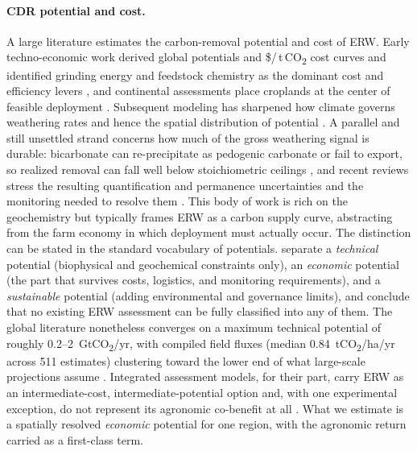 \documentclass[12pt]{article}
\newcommand{\tco}{\,t\,CO\textsubscript{2}}
\newcommand{\co}{CO\textsubscript{2}}
\begin{document}
\paragraph{CDR potential and cost.}
A large literature estimates the carbon-removal potential and cost of ERW. Early
techno-economic work derived global potentials and \$/\tco{} cost curves and
identified grinding energy and feedstock chemistry as the dominant cost and
efficiency levers \citep{strefler2018}, and continental assessments place
croplands at the center of feasible deployment \citep{beerling2020,beerling2025}.
Subsequent modeling has sharpened how climate governs weathering rates and hence
the spatial distribution of potential \citep{baek2023,deng2023}. A parallel and
still unsettled strand concerns how much of the gross weathering signal is
durable: bicarbonate can re-precipitate as pedogenic carbonate or fail to export,
so realized removal can fall well below stoichiometric ceilings
\citep{renforth2019,kanzaki2023}, and recent reviews stress the resulting
quantification and permanence uncertainties and the monitoring needed to resolve
them \citep{schiedung2026,levy2024,beerling2025nree,suhrhoff2026esroc}. This body of work is rich on
the geochemistry but typically frames ERW as a carbon supply curve, abstracting
from the farm economy in which deployment must actually occur.
The distinction can be stated in the standard vocabulary of potentials.
\citet[\S5.2.1]{suhrhoff2026esroc} separate a \emph{technical} potential
(biophysical and geochemical constraints only), an \emph{economic} potential (the
part that survives costs, logistics, and monitoring requirements), and a
\emph{sustainable} potential (adding environmental and governance limits), and
conclude that no existing ERW assessment can be fully classified into any of
them. The global literature nonetheless converges on a maximum technical
potential of roughly 0.2--2~Gt\co{}/yr, with compiled field fluxes (median
0.84~t\co{}/ha/yr across 511 estimates) clustering toward the lower end of what
large-scale projections assume \citep[\S5.1--5.2]{suhrhoff2026esroc}. Integrated
assessment models, for their part, carry ERW as an intermediate-cost,
intermediate-potential option and, with one experimental exception, do not
represent its agronomic co-benefit at all \citep[\S11]{suhrhoff2026esroc}. What
we estimate is a spatially resolved \emph{economic} potential for one region,
with the agronomic return carried as a first-class term.
\end{document}
